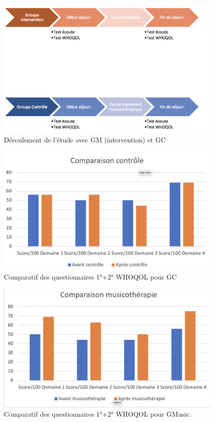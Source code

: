 \begin{figure}
\centering
\includegraphics[width=0.7\linewidth]{images/Groupecontrole.png}
\caption[Schéma du déroulement]{Déroulement de l'étude avec GM (intervention) et GC}
       
\label{groupecontroleimage1}
\end{figure}

\begin{figure}
\centering
\includegraphics[width=0.7\linewidth]{images/Compcontrole.png}
\caption[Schéma du déroulement]{Comparatif des questionnaires 1°+2°
  WHOQOL pour GC}
       
\label{groupecontroleimage1}
\end{figure}

\begin{figure}
\centering
\includegraphics[width=0.7\linewidth]{images/Compmusico.png}
\caption[Schéma du déroulement]{Comparatif des
         questionnaires 1°+2° WHOQOL pour GMusic.}
       
\label{groupecontroleimage1}
\end{figure}

